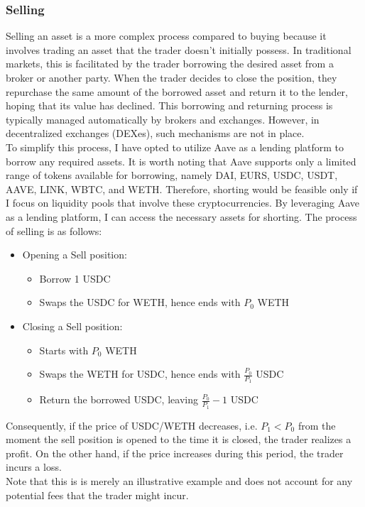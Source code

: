 \subsubsection{Selling}
Selling an asset is a more complex process compared to buying because it involves trading an asset that the trader doesn't initially possess. In traditional markets, this is facilitated by the trader borrowing the desired asset from a broker or another party. When the trader decides to close the position, they repurchase the same amount of the borrowed asset and return it to the lender, hoping that its value has declined. This borrowing and returning process is typically managed automatically by brokers and exchanges. However, in decentralized exchanges (DEXes), such mechanisms are not in place.
\\[5mm]
To simplify this process, I have opted to utilize Aave as a lending platform to borrow any required assets. It is worth noting that Aave supports only a limited range of tokens available for borrowing, namely DAI, EURS, USDC, USDT, AAVE, LINK, WBTC, and WETH. Therefore, shorting would be feasible only if I focus on liquidity pools that involve these cryptocurrencies. By leveraging Aave as a lending platform, I can access the necessary assets for shorting. The process of selling is as follows:
\begin{itemize}
    \item Opening a Sell position:\begin{itemize}
        \item Borrow 1 USDC
        \item Swaps the USDC for WETH, hence ends with $P_0$ WETH
    \end{itemize}
    \item Closing a Sell position:\begin{itemize}
        \item Starts with $P_0$ WETH
        \item Swaps the WETH for USDC, hence ends with $\frac{P_0}{P_1}$ USDC
        \item Return the borrowed USDC, leaving $\frac{P_0}{P_1} - 1$ USDC
    \end{itemize}
\end{itemize}
Consequently, if the price of USDC/WETH decreases, i.e. $P_1 < P_0$ from the moment the sell position is opened to the time it is closed, the trader realizes a profit. On the other hand, if the price increases during this period, the trader incurs a loss.
\\[5mm]
Note that this is is merely an illustrative example and does not account for any potential fees that the trader might incur.

